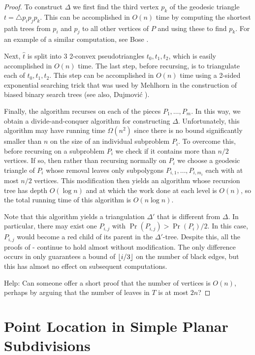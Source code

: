 \documentclass[lotsofwhite]{patmorin}
\newcommand{\z}[1]{{\hat{#1}}}
\begin{document}
\begin{proof}
To construct $\Delta$ we first find the third vertex $p_k$ of the
geodesic triangle $t=\triangle p_i p_j p_k$.  This can be accomplished
in $O(n)$ time by computing the shortest path trees from
$p_i$ and $p_j$ to all other vertices of $P$ and using these to find $p_k$.
For an example of a similar computation, see Bose \etal \cite[Lemma~X]{BXX}.

Next, $\z t$ is split into 3 2-convex pseudotriangles $t_0,t_1,t_2$,
which is easily accomplished in $O(n)$ time.  The last step, before
recursing, is to triangulate each of $t_0,t_1,t_2$.  This step can be
accomplished in $O(n)$ time using a 2-sided exponential searching
trick that was used by Mehlhorn \cite{mXX} in the construction of
biased binary search trees (see also, Dujmovi\'c \etal
\cite[Lemma~X]{soda07}).

Finally, the algorithm recurses on each of the pieces
$P_1,\ldots,P_m$.  In this way, we obtain a divide-and-conquer
algorithm for constructing $\Delta$.  Unfortunately, this algorithm
may have running time $\Omega(n^2)$ since there is no bound
significantly smaller than $n$ on the size of an individual subproblem
$P_i$.  To overcome this, before recursing on a subproblem $P_i$ we
check if it contains more than $n/2$ vertices.  If so, then rather
than recursing normally on $P_i$ we choose a geodesic triangle of
$P_i$ whose removal leaves only subpolygons $P_{i,1},\ldots,P_{i,m_i}$
each with at most $n/2$ vertices.  This modification then yields an
algorithm whose recursion tree has depth $O(\log n)$ and at which the
work done at each level is $O(n)$, so the total running time of this
algorithm is $O(n\log n)$.

Note that this algorithm yields a triangulation $\Delta'$ that is
different from $\Delta$.  In particular, there may exist one $P_{i,j}$
with $\Pr(P_{i,j})>\Pr(P_i)/2$.  In this case, $P_{i,j}$ would become
a red child of its parent in the $\Delta'$-tree.  Despite this, all the
proofs of - continue to hold almost without
modification.  The only difference occurs in  only
guarantees a bound of $\left\lfloor i/3 \right\rfloor$ on the number of black edges, but
this has almost no effect on subsequent computations.

Help: Can someone offer a short proof that the number of vertices is
$O(n)$, perhaps by arguing that the number of leaves in $T$ is at most
$2n$?
\end{proof}

\section{Point Location in Simple Planar Subdivisions}
\end{document}
